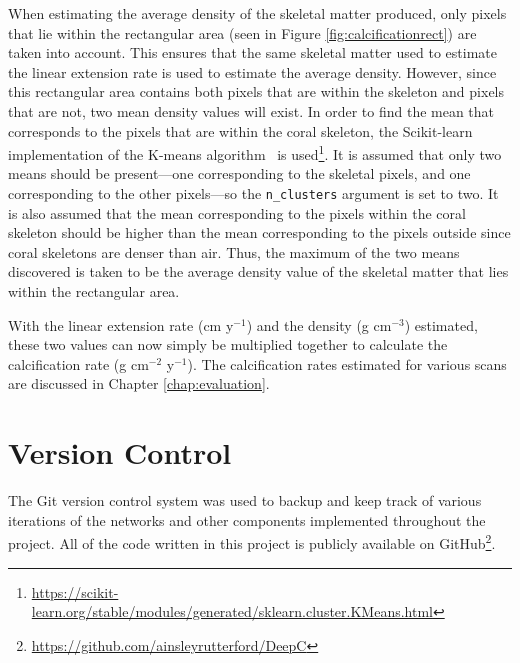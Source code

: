 When estimating the average density of the skeletal matter produced, only pixels that lie within the rectangular area (seen in Figure \ref{fig:calcificationrect}) are taken into account. This ensures that the same skeletal matter used to estimate the linear extension rate is used to estimate the average density. However, since this rectangular area contains both pixels that are within the skeleton and pixels that are not, two mean density values will exist. In order to find the mean that corresponds to the pixels that are within the coral skeleton, the Scikit-learn implementation of the K-means algorithm~\cite{kmeans} is used\footnote{\url{https://scikit-learn.org/stable/modules/generated/sklearn.cluster.KMeans.html}}. It is assumed that only two means should be present---one corresponding to the skeletal pixels, and one corresponding to the other pixels---so the \texttt{n\_clusters} argument is set to two. It is also assumed that the mean corresponding to the pixels within the coral skeleton should be higher than the mean corresponding to the pixels outside since coral skeletons are denser than air. Thus, the maximum of the two means discovered is taken to be the average density value of the skeletal matter that lies within the rectangular area.

With the linear extension rate (cm y$^{-1}$) and the density (g cm$^{-3}$) estimated, these two values can now simply be multiplied together to calculate the calcification rate (g cm$^{-2}$ y$^{-1}$). The calcification rates estimated for various scans are discussed in Chapter \ref{chap:evaluation}.

\section{Version Control}

The Git version control system was used to backup and keep track of various iterations of the networks and other components implemented throughout the project. All of the code written in this project is publicly available on GitHub\footnote{\url{https://github.com/ainsleyrutterford/DeepC}}. 